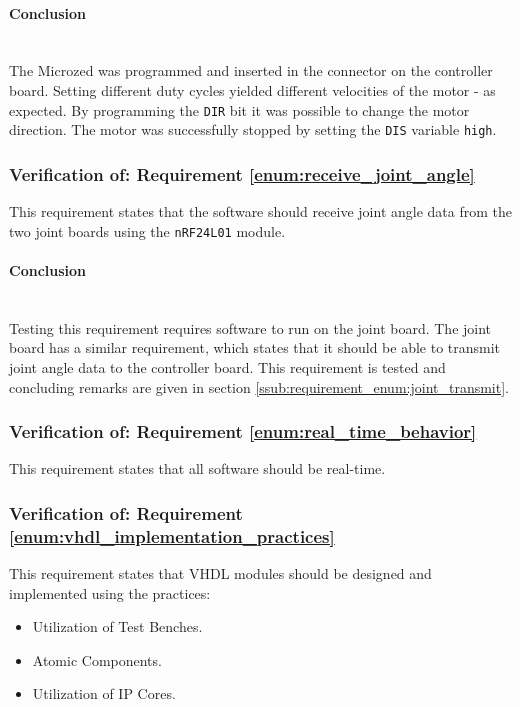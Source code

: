 \paragraph{Conclusion}~\\
The Microzed was programmed and inserted in the connector on the controller board.
Setting different duty cycles yielded different velocities of the motor - as expected.
By programming the \texttt{DIR} bit it was possible to change the motor direction.
The motor was successfully stopped by setting the \texttt{DIS} variable \texttt{high}.

\subsubsection{Verification of: Requirement \ref{enum:receive_joint_angle}} %
\label{ssub:verificatation_of_requirement_enum:receive_joint_angle}
This requirement states that the software should receive joint angle data from the two joint boards using the \texttt{nRF24L01} module.

\paragraph{Conclusion}~\\
Testing this requirement requires software to run on the joint board.
The joint board has a similar requirement, which states that it should be able to transmit joint angle data to the controller board.
This requirement is tested and concluding remarks are given in section \ref{ssub:requirement_enum:joint_transmit}.

\subsubsection{Verification of: Requirement \ref{enum:real_time_behavior}} %
\label{ssub:verification_of_requirement_of_requirement_enum:real_time_behavior}
This requirement states that all software should be real-time.

\subsubsection{Verification of: Requirement \ref{enum:vhdl_implementation_practices}} %
\label{ssub:verification_of_requirement_enum:vhdl_implementation_practices}
This requirement states that VHDL modules should be designed and implemented using the practices:
\begin{itemize}
	\item Utilization of Test Benches.
	\item Atomic Components.
	\item Utilization of IP Cores.
\end{itemize}

